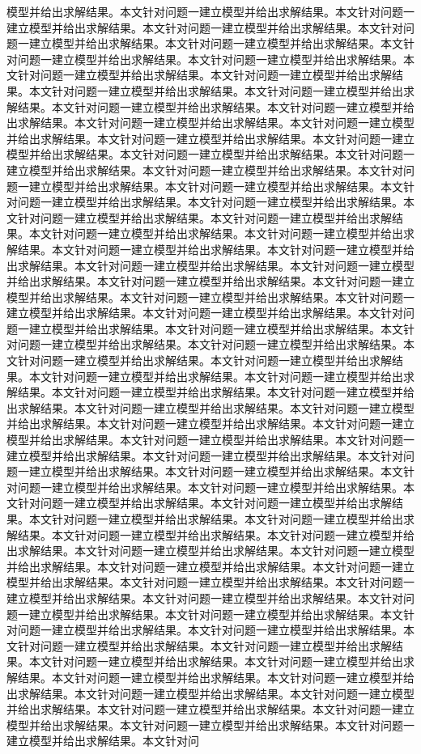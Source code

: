 模型并给出求解结果。本文针对问题一建立模型并给出求解结果。本文针对问题一建立模型并给出求解结果。本文针对问题一建立模型并给出求解结果。本文针对问题一建立模型并给出求解结果。本文针对问题一建立模型并给出求解结果。本文针对问题一建立模型并给出求解结果。本文针对问题一建立模型并给出求解结果。本文针对问题一建立模型并给出求解结果。本文针对问题一建立模型并给出求解结果。本文针对问题一建立模型并给出求解结果。本文针对问题一建立模型并给出求解结果。本文针对问题一建立模型并给出求解结果。本文针对问题一建立模型并给出求解结果。本文针对问题一建立模型并给出求解结果。本文针对问题一建立模型并给出求解结果。本文针对问题一建立模型并给出求解结果。本文针对问题一建立模型并给出求解结果。本文针对问题一建立模型并给出求解结果。本文针对问题一建立模型并给出求解结果。本文针对问题一建立模型并给出求解结果。本文针对问题一建立模型并给出求解结果。本文针对问题一建立模型并给出求解结果。本文针对问题一建立模型并给出求解结果。本文针对问题一建立模型并给出求解结果。本文针对问题一建立模型并给出求解结果。本文针对问题一建立模型并给出求解结果。本文针对问题一建立模型并给出求解结果。本文针对问题一建立模型并给出求解结果。本文针对问题一建立模型并给出求解结果。本文针对问题一建立模型并给出求解结果。本文针对问题一建立模型并给出求解结果。本文针对问题一建立模型并给出求解结果。本文针对问题一建立模型并给出求解结果。本文针对问题一建立模型并给出求解结果。本文针对问题一建立模型并给出求解结果。本文针对问题一建立模型并给出求解结果。本文针对问题一建立模型并给出求解结果。本文针对问题一建立模型并给出求解结果。本文针对问题一建立模型并给出求解结果。本文针对问题一建立模型并给出求解结果。本文针对问题一建立模型并给出求解结果。本文针对问题一建立模型并给出求解结果。本文针对问题一建立模型并给出求解结果。本文针对问题一建立模型并给出求解结果。本文针对问题一建立模型并给出求解结果。本文针对问题一建立模型并给出求解结果。本文针对问题一建立模型并给出求解结果。本文针对问题一建立模型并给出求解结果。本文针对问题一建立模型并给出求解结果。本文针对问题一建立模型并给出求解结果。本文针对问题一建立模型并给出求解结果。本文针对问题一建立模型并给出求解结果。本文针对问题一建立模型并给出求解结果。本文针对问题一建立模型并给出求解结果。本文针对问题一建立模型并给出求解结果。本文针对问题一建立模型并给出求解结果。本文针对问题一建立模型并给出求解结果。本文针对问题一建立模型并给出求解结果。本文针对问题一建立模型并给出求解结果。本文针对问题一建立模型并给出求解结果。本文针对问题一建立模型并给出求解结果。本文针对问题一建立模型并给出求解结果。本文针对问题一建立模型并给出求解结果。本文针对问题一建立模型并给出求解结果。本文针对问题一建立模型并给出求解结果。本文针对问题一建立模型并给出求解结果。本文针对问题一建立模型并给出求解结果。本文针对问题一建立模型并给出求解结果。本文针对问题一建立模型并给出求解结果。本文针对问题一建立模型并给出求解结果。本文针对问题一建立模型并给出求解结果。本文针对问题一建立模型并给出求解结果。本文针对问题一建立模型并给出求解结果。本文针对问题一建立模型并给出求解结果。本文针对问题一建立模型并给出求解结果。本文针对问题一建立模型并给出求解结果。本文针对问题一建立模型并给出求解结果。本文针对问题一建立模型并给出求解结果。本文针对问题一建立模型并给出求解结果。本文针对问题一建立模型并给出求解结果。本文针对问题一建立模型并给出求解结果。本文针对问题一建立模型并给出求解结果。本文针对问题一建立模型并给出求解结果。本文针对问题一建立模型并给出求解结果。本文针对问题一建立模型并给出求解结果。本文针对问题一建立模型并给出求解结果。本文针对问题一建立模型并给出求解结果。本文针对问